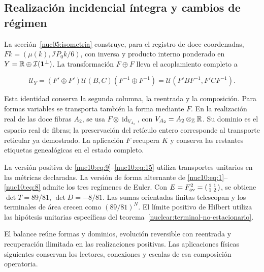 \subsection{Realización incidencial íntegra y cambios de régimen}

La sección~\ref{nuc05:isometria} construye, para el registro de doce
coordenadas, \(Fk=(\mu(k),\mathcal IP_0k/6)\), con inversa y
producto interno ponderado en \(Y=\mathbb R\oplus\mathcal I(\mathbf1^\perp)\).
La transformación \(F\oplus F\) lleva el acoplamiento completo a



\begin{equation}
\mathcal U_Y=(F'\oplus F')\mathcal U(B,C)(F^{-1}\oplus F^{-1})
=\mathcal U(F'BF^{-1},F'CF^{-1}).
\label{nuc10:eq:16}
\end{equation}



Esta identidad conserva la segunda columna, la reentrada y la composición.
Para formas variables se transporta también la forma mediante \(F\).
En la realización real de las doce fibras \(A_2\), se usa
\(F\otimes\operatorname{id}_{V_{A_2}}\), con
\(V_{A_2}=A_2\otimes_{\mathbb Z}\mathbb R\). Su dominio es el espacio real de
fibras; la preservación del retículo entero corresponde al transporte
reticular ya demostrado. La aplicación \(F\) recupera \(K\) y
conserva las restantes etiquetas genealógicas en el estado completo.

La versión positiva de \eqref{nuc10:eq:9}–\eqref{nuc10:eq:15} utiliza transportes unitarios en las
métricas declaradas. La versión de forma alternante de \eqref{nuc10:eq:1}–\eqref{nuc10:eq:8} admite
los tres regímenes de Euler. Con
\(E=F_{\rm av}^2=\left(\begin{smallmatrix}1&1\\1&2\end{smallmatrix}\right)\),
se obtiene \(\det T=89/81\), \(\det D=-8/81\). Las sumas
orientadas finitas telescopan y los terminales de área crecen como
\((89/81)^N\). El límite positivo de Hilbert utiliza las hipótesis
unitarias específicas del teorema~\ref{nuclear:terminal-no-estacionario}.

El balance reúne formas y dominios, evolución reversible con reentrada
y recuperación ilimitada en las realizaciones positivas. Las
aplicaciones físicas siguientes conservan los lectores, conexiones y
escalas de esa composición operatoria.
